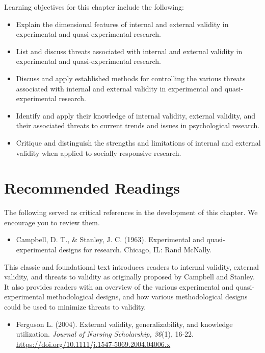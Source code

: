 \documentclass[
  11pt,
]{book}
\providecommand{\tightlist}{%
  \setlength{\itemsep}{0pt}\setlength{\parskip}{0pt}}
\begin{document}
Learning objectives for this chapter include the following:

\begin{itemize}
\tightlist
\item
  Explain the dimensional features of internal and external validity in experimental and quasi-experimental research.
\item
  List and discuss threats associated with internal and external validity in experimental and quasi-experimental research.
\item
  Discuss and apply established methods for controlling the various threats associated with internal and external validity in experimental and quasi-experimental research.
\item
  Identify and apply their knowledge of internal validity, external validity, and their associated threats to current trends and issues in psychological research.
\item
  Critique and distinguish the strengths and limitations of internal and external validity when applied to socially responsive research.
\end{itemize}

\section{Recommended Readings}\label{recommended-readings}

The following served as critical references in the development of this chapter. We encourage you to review them.

\begin{itemize}
\tightlist
\item
  Campbell, D. T., \& Stanley, J. C. (1963). Experimental and quasi- experimental designs for research. Chicago, IL: Rand McNally.
\end{itemize}

This classic and foundational text introduces readers to internal validity, external validity, and threats to validity as originally proposed by Campbell and Stanley. It also provides readers with an overview of the various experimental and quasi-experimental methodological designs, and how various methodological designs could be used to minimize threats to validity.

\begin{itemize}
\tightlist
\item
  Ferguson L. (2004). External validity, generalizability, and knowledge utilization. \emph{Journal of Nursing Scholarship, 36}(1), 16-22. \url{https://doi.org/10.1111/j.1547-5069.2004.04006.x}
\end{itemize}
\end{document}
